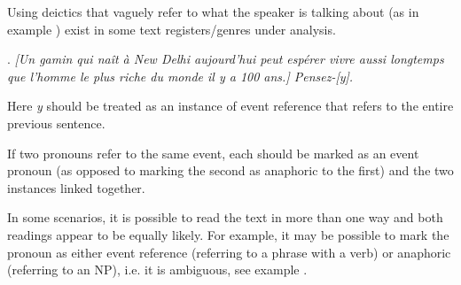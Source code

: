\documentclass[a4paper]{article}
\begin{document}
Using deictics that vaguely refer to what the speaker is talking about (as in example \Next) exist in some text registers/genres under analysis. 

\ex.
\textsl{[Un gamin qui naît à New Delhi aujourd'hui peut espérer vivre aussi
longtemps que l'homme le plus riche du monde il y a 100 ans.] Pensez-[y].}

Here \textsl{y} should be treated as an instance of event reference that refers
to the entire previous sentence.


% 
% 
% 
If two pronouns refer to the same event, each should be marked as an event pronoun (as opposed to marking the second as anaphoric to the first) and the two instances linked together.

In some scenarios, it is possible to read the text in more than one way and both readings appear to be equally likely. For example, it may be possible to mark the pronoun as either event reference (referring to a phrase with a verb) or
anaphoric (referring to an NP), i.e. it is ambiguous, see example \Next.
\end{document}
